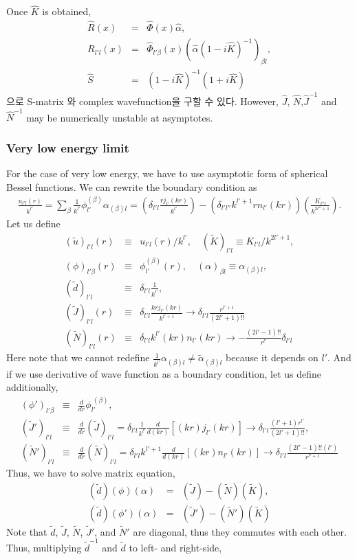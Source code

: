 \documentclass[10pt]{article}
\newcommand{\bea}{\begin{eqnarray}}
\newcommand{\eea}{\end{eqnarray}}
\newcommand{\no}{\nonumber \\}
\begin{document}
Once $\hat{K}$ is obtained,
\bea
\hat{R}(x)&=&\hat{\Phi}(x)\hat{\alpha},\no
R_{l'l}(x)&=&\hat{\Phi}_{l'\beta}(x)(\hat{\alpha}(1-i\hat{K})^{-1})_{\beta l},\no
\hat{S}&=&(1-i\hat{K})^{-1}(1+i\hat{K})
\eea
으로 S-matrix 와 complex wavefunction을 구할 수 있다.
However, $\hat{J}$, $\hat{N}$,$\hat{J}^{-1}$ and $\hat{N}^{-1}$
may be numerically unstable at asymptotes. 

\subsubsection{ Very low energy limit } 
For the case of very low energy, we have to use asymptotic form
of spherical Bessel functions. We can rewrite the boundary condition
as
\bea
\frac{u_{l'l}(r)}{k^{l'}}
=\sum_{\beta} \frac{1}{k^{l'}}\phi_{l'}^{(\beta)}\alpha_{(\beta)l}
=\left(\delta_{l'l} \frac{r j_{l'}(kr)}{k^{l'}}\right)
-\left(\delta_{l' l''} k^{l'+1}r n_{l'}(kr)\right)
 \left(\frac{K_{l'' l}}{k^{2l''+1}}\right).
\eea
Let us define
\bea
(\tilde{u})_{l'l}(r)&\equiv& u_{l'l}(r)/k^{l'},
\quad (\tilde{K})_{l'l}\equiv K_{l'l}/k^{2l'+1},\no
(\phi)_{l'\beta}(r)&\equiv& \phi_{l'}^{(\beta)}(r),
\quad ({\alpha})_{\beta l}\equiv {\alpha}_{(\beta)l},\no
(\tilde{d})_{l'l}&\equiv&\delta_{l'l}\frac{1}{k^{l'}},\no
(\tilde{J})_{l'l}(r)&\equiv& \delta_{l'l}\frac{k r j_{l'}(kr)}{k^{l'+1}}
       \to \delta_{l'l}\frac{r^{l'+1}}{(2l'+1)!!}
       \no
(\tilde{N})_{l'l}(r)&\equiv&  \delta_{l'l} k^{l'} (kr)n_{l'}(kr)
       \to -\frac{(2l'-1)!!}{r^{l'}}\delta_{l'l} 
\eea
Here note that we cannot redefine 
$\frac{1}{k^{l'}}\alpha_{(\beta)l}\neq \tilde{\alpha}_{(\beta)l} $
because it depends on $l'$. 
And if we use derivative of wave function as a boundary condition,
let us define additionally,
\bea
({\phi}')_{l'\beta}&\equiv& \frac{d}{dr}\phi_{l'}^{\ (\beta)},\no
(\tilde{J}')_{l'l}&\equiv& \frac{d}{dr}(\tilde{J})_{l'l}
                   =\delta_{l'l}\frac{1}{k^{l'}}
                    \frac{d}{d(kr)}[(kr)j_{l'}(kr)]
                   \to \delta_{l'l}\frac{(l'+1)r^{l'}}{(2l'+1)!!}
                   ,\no
(\tilde{N}')_{l'l}&\equiv&\frac{d}{dr}(\tilde{N})_{l'l}
                  =\delta_{l'l} k^{l'+1}\frac{d}{d(kr)}[(kr)n_{l'}(kr)]
                  \to \delta_{l'l}\frac{(2l'-1)!!(l')}{r^{l'+1}}   
\eea
Thus, we have to solve matrix equation,
\bea
(\tilde{d})(\phi)({\alpha})&=&(\tilde{J})-(\tilde{N})(\tilde{K}),\no
(\tilde{d})(\phi')({\alpha})&=&(\tilde{J}')-(\tilde{N}')(\tilde{K})
\eea
Note that $\tilde{d}$, $\tilde{J}$, $\tilde{N}$, $\tilde{J}'$,
and $\tilde{N}'$ are diagonal, thus they commutes with each other.
Thus, multiplying $\tilde{d}^{-1}$ and $\tilde{d}$ to left- and right-side,
\end{document}
